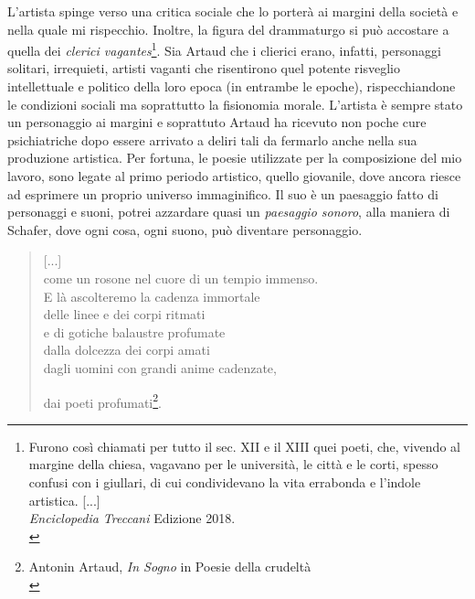 L'artista spinge verso una critica sociale che lo porterà ai margini della società e nella quale mi rispecchio. Inoltre, la figura del drammaturgo si può accostare a quella dei \textit{clerici vagantes}\footnote{Furono così chiamati per tutto il sec. XII e il XIII quei poeti, che, vivendo al margine della chiesa, vagavano per le università, le città e le corti, spesso confusi con i giullari, di cui condividevano la vita errabonda e l'indole artistica. [...] \\ \textit{Enciclopedia Treccani} Edizione 2018. \\}. Sia Artaud che i clierici erano, infatti, personaggi solitari, irrequieti, artisti vaganti che risentirono quel potente risveglio intellettuale e politico della loro epoca (in entrambe le epoche), rispecchiandone le condizioni sociali ma soprattutto la fisionomia morale. L'artista è sempre stato un personaggio ai margini e soprattuto Artaud ha ricevuto non poche cure psichiatriche dopo essere arrivato a deliri tali da fermarlo anche nella sua produzione artistica. Per fortuna, le poesie utilizzate per la composizione del mio lavoro, sono legate al primo periodo artistico, quello giovanile, dove ancora riesce ad esprimere un proprio universo immaginifico. Il suo è un paesaggio fatto di personaggi e suoni, potrei azzardare quasi un \textit{paesaggio sonoro}, alla maniera di Schafer, dove ogni cosa, ogni suono, può diventare personaggio.
\begin{quotation}
[...] \\
come un rosone nel cuore di un tempio immenso. \\
E là ascolteremo la cadenza immortale \\
delle linee e dei corpi ritmati \\
e di gotiche balaustre profumate \\
dalla dolcezza dei corpi amati \\
dagli uomini con grandi anime cadenzate, \\
\centerline{dai poeti profumati\footnote{Antonin Artaud, \textit{In Sogno} in Poesie della crudeltà \\}.}
\end{quotation}

